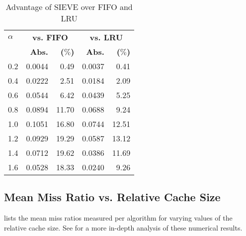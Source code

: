 \begin{table}[h!]
    \centering
    \caption{Advantage of SIEVE over FIFO and LRU}
    \label{tab: sieve_advantage}
    \begin{tabular}{l rr rr}
        \toprule
        \textbf{$\alpha$} & \multicolumn{2}{c}{\textbf{vs. FIFO}} & \multicolumn{2}{c}{\textbf{vs. LRU}} \\
        \cmidrule(lr){2-3} \cmidrule(lr){4-5}
        & \textbf{Abs.} & \textbf{($\%$)} & \textbf{Abs.} & \textbf{($\%$)} \\
        \midrule
        0.2 & 0.0044 & 0.49 & 0.0037 & 0.41 \\
        0.4 & 0.0222 & 2.51 & 0.0184 & 2.09 \\
        0.6 & 0.0544 & 6.42 & 0.0439 & 5.25 \\
        0.8 & 0.0894 & 11.70 & 0.0688 & 9.24 \\
        1.0 & 0.1051 & 16.80 & 0.0744 & 12.51 \\
        1.2 & 0.0929 & 19.29 & 0.0587 & 13.12 \\
        1.4 & 0.0712 & 19.62 & 0.0386 & 11.69 \\
        1.6 & 0.0528 & 18.33 & 0.0240 & 9.26 \\
        \bottomrule
    \end{tabular}
\end{table}

\subsection{Mean Miss Ratio vs. Relative Cache Size}\label{appendix:rel-cache-size}

 lists the mean miss ratios measured per algorithm for varying values of the relative cache size. See  for a more in-depth analysis of these numerical results.


